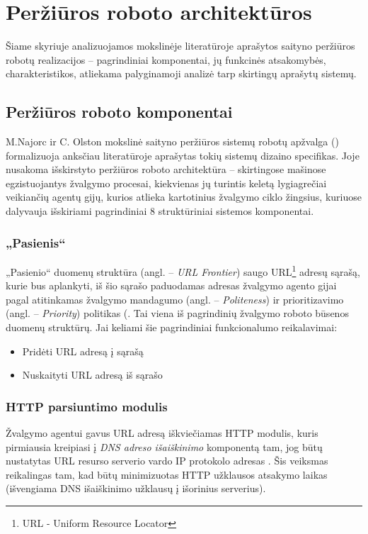\section{Peržiūros roboto architektūros}

Šiame skyriuje analizuojamos mokslinėje literatūroje aprašytos saityno peržiūros robotų realizacijos -- pagrindiniai komponentai, jų funkcinės atsakomybės, charakteristikos, atliekama palyginamoji analizė tarp skirtingų aprašytų sistemų.

\subsection{Peržiūros roboto komponentai}

M.Najorc ir C. Olston mokslinė saityno peržiūros sistemų robotų apžvalga (\cite{StanfWebCrawl}) formalizuoja anksčiau literatūroje aprašytas tokių sistemų dizaino specifikas. Joje nusakoma išskirstyto peržiūros roboto architektūra -- skirtingose mašinose egzistuojantys žvalgymo procesai, kiekvienas jų turintis keletą lygiagrečiai veikiančių agentų gijų, kurios atlieka kartotinius žvalgymo ciklo žingsius, kuriuose dalyvauja išskiriami pagrindiniai 8 struktūriniai sistemos komponentai.

\subsubsection{„Pasienis“}

„Pasienio“ duomenų struktūra (angl. -- \textit{URL Frontier}) saugo URL\footnote{URL - Uniform Resource Locator} adresų sąrašą, kurie bus aplankyti, iš šio sąrašo paduodamas adresas žvalgymo agento gijai pagal atitinkamas žvalgymo mandagumo (angl. -- \textit{Politeness}) ir prioritizavimo (angl. -- \textit{Priority}) politikas (\cite{StanfWebCrawl}. Tai viena iš pagrindinių žvalgymo roboto būsenos duomenų struktūrų. Jai keliami šie pagrindiniai funkcionalumo reikalavimai:
\begin{itemize}
    \item Pridėti URL adresą į sąrašą
    \item Nuskaityti URL adresą iš sąrašo
\end{itemize}

\subsubsection{HTTP parsiuntimo modulis}

Žvalgymo agentui gavus URL adresą iškviečiamas HTTP modulis, kuris pirmiausia kreipiasi į \textit{DNS adreso išaiškinimo} komponentą tam, jog būtų nustatytas URL resurso serverio vardo IP protokolo adresas \cite{StanfWebCrawl}. Šis veiksmas reikalingas tam, kad būtų minimizuotas HTTP užklausos atsakymo laikas (išvengiama DNS išaiškinimo užklausų į išorinius serverius).

